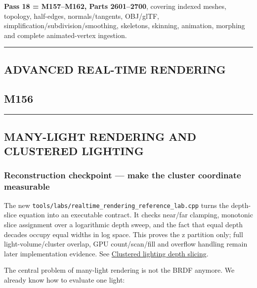 \textbf{Pass 18 = M157--M162, Parts 2601--2700}, covering indexed meshes, topology, half-edges, normals/tangents, OBJ/glTF, simplification/subdivision/smoothing, skeletons, skinning, animation, morphing and complete animated-vertex ingestion.

\begin{center}\rule{0.5\linewidth}{0.5pt}\end{center}

\subsection{ADVANCED REAL-TIME RENDERING}\label{04-visual-computing-ii-ch040-advanced-real-time-rendering}

\subsection{M156}\label{04-visual-computing-ii-ch040-m156}

\begin{center}\rule{0.5\linewidth}{0.5pt}\end{center}

\subsection{MANY-LIGHT RENDERING AND CLUSTERED LIGHTING}\label{04-visual-computing-ii-ch040-many-light-rendering-and-clustered-lighting}

\subsubsection{Reconstruction checkpoint --- make the cluster coordinate measurable}\label{04-visual-computing-ii-ch040-reconstruction-checkpoint-make-the-cluster-coordinate-measurable}

The new \texttt{tools/labs/realtime\_rendering\_reference\_lab.cpp} turns the depth-slice equation into an executable contract. It checks near/far clamping, monotonic slice assignment over a logarithmic depth sweep, and the fact that equal depth decades occupy equal widths in log space. This proves the z partition only; full light-volume/cluster overlap, GPU count/scan/fill and overflow handling remain later implementation evidence. See \hyperref[appendix-b0efeb3f3648]{Clustered lighting depth slicing}.

The central problem of many-light rendering is not the BRDF anymore. We already know how to evaluate one light:


